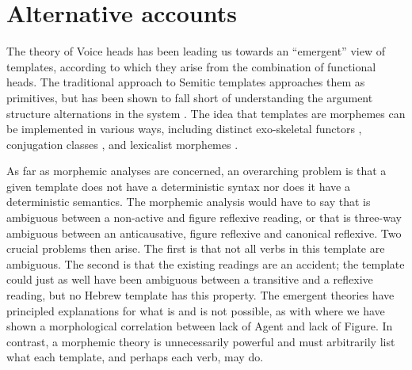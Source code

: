 {%
%






\section{Alternative accounts} \label{vz:others}
The theory of Voice heads has been leading us towards an ``emergent'' view of templates, according to which they arise from the combination of functional heads. The traditional approach to Semitic templates approaches them as primitives, but has been shown to fall short of understanding the argument structure alternations in the system \citep{doron03,kastner16phd,kastner17gjgl,kastner18nllt}. The idea that templates are morphemes can be implemented in various ways, including distinct exo-skeletal functors \citep{borer13oup}, conjugation classes \citep{arad05,aronoff07}, and lexicalist morphemes \citep{reinhartsiloni05,laks11,laks14}.

As far as morphemic analyses are concerned, an overarching problem is that a given template does not have a deterministic syntax nor does it have a deterministic semantics. The morphemic analysis would have to say that {\tnif} is ambiguous between a non-active and figure reflexive reading, or that {\thit} is three-way ambiguous between an anticausative, figure reflexive and canonical reflexive. Two crucial problems then arise. The first is that not all verbs in this template are ambiguous. The second is that the existing readings are an accident; the template could just as well have been ambiguous between a transitive and a reflexive reading, but no Hebrew template has this property. The emergent theories have principled explanations for what is and is not possible, as with {\tnif} where we have shown a morphological correlation between lack of Agent and lack of Figure. In contrast, a morphemic theory is unnecessarily powerful and must arbitrarily list what each template, and perhaps each verb, may do.

}
